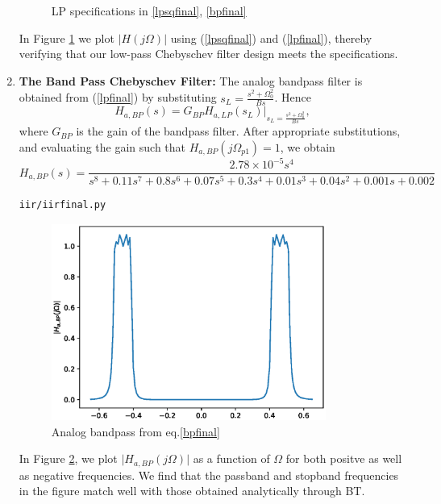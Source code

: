 \documentclass[journal,12pt,twocolumn]{IEEEtran}
\begin{document}
\begin{enumerate}
\begin{figure}[!ht]
    \caption{LP specifications in \ref{lpsqfinal}, \ref{bpfinal}}
    \label{fig:Analog_cheb}
\end{figure}
In Figure \ref{fig:Analog_cheb} we plot $|H(j\Omega)|$ using (\ref{lpsqfinal}) and (\ref{lpfinal}), thereby verifying that our low-pass Chebyschev filter design meets the specifications.
\item \textbf{The Band Pass Chebyschev Filter:}  The analog bandpass filter is obtained from (\ref{lpfinal}) by substituting
$s_L = \frac{s^2 + \Omega_0^2}{Bs}$.  Hence
\begin{equation}
H_{a,BP}(s) = G_{BP}H_{a,LP}(s_L)\vert_{s_L = \frac{s^2 + \Omega_0^2}{Bs}},
\end{equation}
where $G_{BP}$ is the gain of the bandpass filter.  After appropriate substitutions, and evaluating the gain 
such that $H_{a,BP}(j\Omega_{p1}) = 1$, we obtain
{\tiny
\begin{equation}
\label{bpfinal}
H_{a,BP}(s) = \frac{2.78\times 10^{-5}s^4}{s^8+0.11s^7+0.8s^6+0.07s^5+0.3s^4+0.01s^3+0.04s^2+0.001s+0.002}
\end{equation}
}
\begin{lstlisting}
iir/iirfinal.py
\end{lstlisting}
\begin{figure}[!ht]
    \centering
    \includegraphics[width=9cm]{./figs/iir/BP_analog.eps}
    \caption{Analog bandpass from eq.\ref{bpfinal}}
    \label{fig:Analog_BP}
\end{figure}
In Figure \ref{fig:Analog_BP}, we plot $\vert H_{a,BP}(j\Omega)\vert$ as a function of $\Omega$ for both positve as
well as negative frequencies.  We find that the passband and stopband frequencies in the figure
match well with those obtained analytically through BT.
\end{enumerate}
\end{document}
